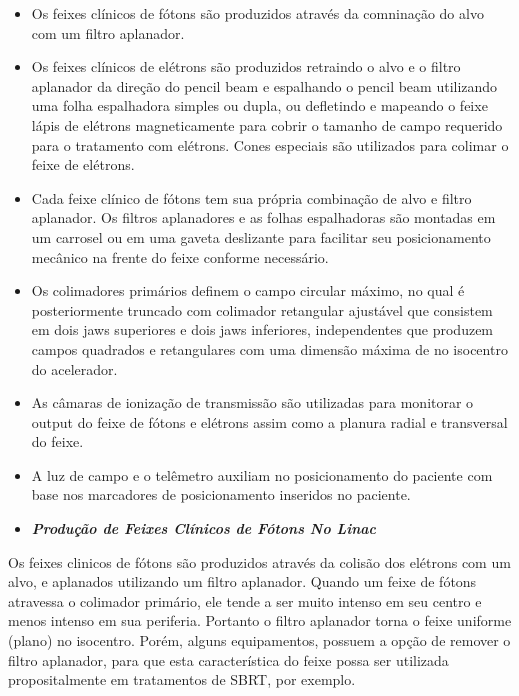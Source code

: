 \documentclass[11pt,a4paper]{article}
\newcounter{exemplo}
\begin{document}
    \begin{itemize}
		\item Os feixes clínicos de fótons são produzidos através da comninação do alvo com um filtro aplanador.
		\item Os feixes clínicos de elétrons são produzidos retraindo o alvo e o filtro aplanador da direção do pencil beam e espalhando o pencil beam utilizando uma folha espalhadora simples ou dupla, ou defletindo e mapeando o feixe lápis de elétrons magneticamente para cobrir o tamanho de campo requerido para o tratamento com elétrons. Cones especiais são utilizados para colimar o feixe de elétrons.
		\item Cada feixe clínico de fótons tem sua própria combinação de alvo e filtro aplanador. Os filtros aplanadores e as folhas espalhadoras são montadas em um carrosel ou em uma gaveta deslizante para facilitar seu posicionamento mecânico na frente do feixe conforme necessário.
		\item Os colimadores primários definem o campo circular máximo, no qual é posteriormente truncado com colimador retangular ajustável que consistem em dois jaws superiores e dois jaws inferiores, independentes que produzem campos quadrados e retangulares com uma dimensão máxima de  no isocentro do acelerador.
		\item As câmaras de ionização de transmissão são utilizadas para monitorar o output do feixe de fótons e elétrons assim como a planura radial e transversal do feixe.
		\item A luz de campo e o telêmetro auxiliam no posicionamento do paciente com base nos marcadores de posicionamento inseridos no paciente.
	\end{itemize}                
                    
                \begin{itemize}
                    \item \textbf{\textit{\textcolor{CarnationPink}{Produção de Feixes Clínicos de Fótons No Linac}}}
                \end{itemize}

    Os feixes clinicos de fótons são produzidos através da colisão dos elétrons com um alvo, e aplanados utilizando um filtro aplanador. Quando um feixe de fótons atravessa o colimador primário, ele tende a ser muito intenso em seu centro e menos intenso em sua periferia. Portanto o filtro aplanador torna o feixe uniforme (plano) no isocentro. Porém, alguns equipamentos, possuem a opção de remover o filtro aplanador, para que esta característica do feixe possa ser utilizada propositalmente em tratamentos de SBRT, por exemplo.
\end{document}

